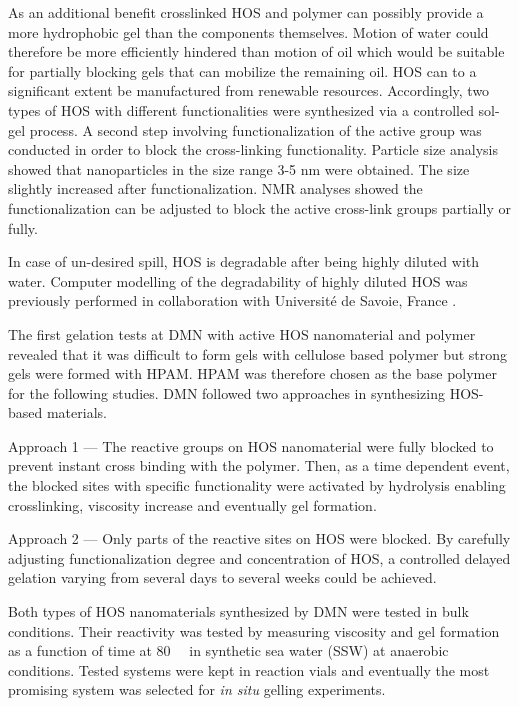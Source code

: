 \documentclass[nanomaterials,article,submit,moreauthors,pdftex]{Definitions/mdpi}
\begin{document}
As an additional benefit crosslinked HOS and polymer can possibly provide a more hydrophobic gel than the components themselves. Motion of water could therefore be more efficiently hindered than motion of oil which would be suitable for partially blocking gels that can mobilize the remaining oil. HOS can to a significant extent be manufactured from renewable resources. Accordingly, two types of HOS with different functionalities were synthesized via a controlled sol-gel process. A second step involving functionalization of the active group was conducted in order to block the cross-linking functionality. Particle size analysis showed that nanoparticles in the size range 3-5 nm were obtained. The size slightly increased after functionalization. NMR analyses showed the functionalization can be adjusted to block the active cross-link groups partially or fully. 

In case of un-desired spill, HOS is degradable after being highly diluted with water. Computer modelling of the degradability of highly diluted HOS was previously performed in collaboration with Université de Savoie, France \citep{Neyertz2012,Neyertz2013}.

The first gelation tests at DMN with active HOS nanomaterial and polymer revealed that it was difficult to form gels with cellulose based polymer but strong gels were formed with HPAM. HPAM was therefore chosen as the base polymer for the following studies. DMN followed two approaches in synthesizing HOS-based materials.
    
    Approach 1 --- The reactive groups on HOS nanomaterial were fully blocked to prevent instant cross binding with the polymer. Then, as a time dependent event, the blocked sites with specific functionality were activated by hydrolysis enabling crosslinking, viscosity increase and eventually gel formation. 
    
    Approach 2 --- Only parts of the reactive sites on HOS were blocked. By carefully adjusting functionalization degree and concentration of HOS, a controlled delayed gelation varying from several days to several weeks could be achieved. 
    
Both types of HOS nanomaterials synthesized by DMN were tested in bulk conditions. Their reactivity was tested by measuring viscosity and gel formation as a function of time at 80~\celsius~ in synthetic sea water (SSW) at anaerobic conditions. Tested systems were kept in reaction vials and eventually the most promising system  was selected for \textit{in situ} gelling experiments.
    
\end{document}
